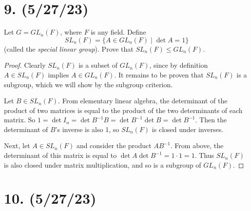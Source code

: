 \documentclass{article}
\begin{document}
\section*{9. (5/27/23)}

Let $G = GL_n(F)$, where $F$ is any field. Define
\begin{equation*}
    SL_n(F) = \{ A \in GL_n(F) \mid \det{A} = 1 \}
\end{equation*}
(called the \emph{special linear group}). Prove that $SL_n(F) \leq GL_n(F)$.

\begin{proof}
    Clearly $SL_n(F)$ is a subset of $GL_n(F)$, since by definition $A \in SL_n(F)$ implies $A \in GL_n(F)$. It remains to be proven that $SL_n(F)$ is a subgroup, which we will show by the subgroup criterion.

    Let $B \in SL_n(F)$. From elementary linear algebra, the determinant of the product of two matrices is equal to the product of the two determinants of each matrix. So $1 = \det{I_n} = \det{B^{-1} B} = \det{B^{-1}} \det{B} = \det{B^{-1}}$. Then the determinant of $B$'s inverse is also 1, so $SL_n(F)$ is closed under inverses.

    Next, let $A \in SL_n(F)$ and consider the product $AB^{-1}$. From above, the determinant of this matrix is equal to $\det{A} \det{B^{-1}} = 1 \cdot 1 = 1$. Thus $SL_n(F)$ is also closed under matrix multiplication, and so is a subgroup of $GL_n(F)$.
\end{proof}

\section*{10. (5/27/23)}
\end{document}
